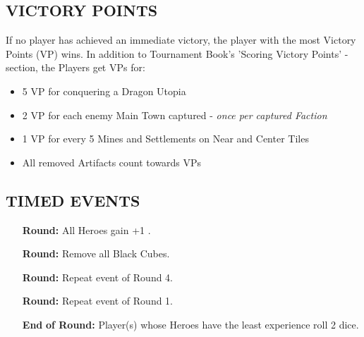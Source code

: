 \begin{multicols*}{2}
\subsection*{\MakeUppercase{Victory Points}}
If no player has achieved an immediate victory, the player with the most Victory Points (VP) wins. In addition to Tournament Book's 'Scoring Victory Points' -section, the Players get VPs for:

\begin{itemize}
 \item 5 VP for conquering a Dragon Utopia
 \item 2 VP for each enemy Main Town captured - \textit{once per captured Faction}
 \item 1 VP for every 5 Mines and Settlements on Near and Center Tiles
 \item All removed Artifacts count towards VPs
\end{itemize}

\subsection*{\MakeUppercase{Timed Events}}

\begin{itemize}
  \item[\textbf{\nth{1}}] \textbf{Round:} All Heroes gain +1 .
  \item[\textbf{\nth{4}}] \textbf{Round:} Remove all Black Cubes. %
  \item[\textbf{\nth{8}}] \textbf{Round:} Repeat event of Round 4.
  \item[\textbf{\nth{9}}] \textbf{Round:} Repeat event of Round 1.
  \item[\textbf{End}] \textbf{of  Round:} Player(s) whose Heroes have the least experience roll 2  dice.
\end{itemize}

\end{multicols*}
